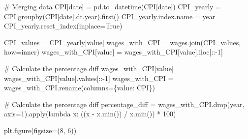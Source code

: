 \documentclass[
  letterpaper,
  DIV=11,
  numbers=noendperiod]{scrartcl}
\newenvironment{Shaded}{\begin{snugshade}}{\end{snugshade}}
\newcommand{\BuiltInTok}[1]{\textcolor[rgb]{0.00,0.23,0.31}{#1}}
\newcommand{\CommentTok}[1]{\textcolor[rgb]{0.37,0.37,0.37}{#1}}
\newcommand{\DecValTok}[1]{\textcolor[rgb]{0.68,0.00,0.00}{#1}}
\newcommand{\KeywordTok}[1]{\textcolor[rgb]{0.00,0.23,0.31}{#1}}
\newcommand{\NormalTok}[1]{\textcolor[rgb]{0.00,0.23,0.31}{#1}}
\newcommand{\OperatorTok}[1]{\textcolor[rgb]{0.37,0.37,0.37}{#1}}
\newcommand{\StringTok}[1]{\textcolor[rgb]{0.13,0.47,0.30}{#1}}
\newcommand{\VariableTok}[1]{\textcolor[rgb]{0.07,0.07,0.07}{#1}}
\begin{document}
\begin{Shaded}
\begin{Highlighting}[]
\CommentTok{\# Merging data}
\NormalTok{CPI[}\StringTok{\textquotesingle{}date\textquotesingle{}}\NormalTok{] }\OperatorTok{=}\NormalTok{ pd.to\_datetime(CPI[}\StringTok{\textquotesingle{}date\textquotesingle{}}\NormalTok{])}
\NormalTok{CPI\_yearly }\OperatorTok{=}\NormalTok{ CPI.groupby(CPI[}\StringTok{\textquotesingle{}date\textquotesingle{}}\NormalTok{].dt.year).first()}
\NormalTok{CPI\_yearly.index.name }\OperatorTok{=} \StringTok{\textquotesingle{}year\textquotesingle{}}
\NormalTok{CPI\_yearly.reset\_index(inplace}\OperatorTok{=}\VariableTok{True}\NormalTok{)}

\NormalTok{CPI\_values }\OperatorTok{=}\NormalTok{ CPI\_yearly[}\StringTok{\textquotesingle{}value\textquotesingle{}}\NormalTok{]}
\NormalTok{wages\_with\_CPI }\OperatorTok{=}\NormalTok{ wages.join(CPI\_values, how}\OperatorTok{=}\StringTok{\textquotesingle{}inner\textquotesingle{}}\NormalTok{)}
\NormalTok{wages\_with\_CPI[}\StringTok{\textquotesingle{}value\textquotesingle{}}\NormalTok{] }\OperatorTok{=}\NormalTok{ wages\_with\_CPI[}\StringTok{\textquotesingle{}value\textquotesingle{}}\NormalTok{].iloc[::}\OperatorTok{{-}}\DecValTok{1}\NormalTok{]}

\CommentTok{\# Calculate the percentage diff}
\NormalTok{wages\_with\_CPI[}\StringTok{\textquotesingle{}value\textquotesingle{}}\NormalTok{] }\OperatorTok{=}\NormalTok{ wages\_with\_CPI[}\StringTok{\textquotesingle{}value\textquotesingle{}}\NormalTok{].values[::}\OperatorTok{{-}}\DecValTok{1}\NormalTok{]}
\NormalTok{wages\_with\_CPI }\OperatorTok{=}\NormalTok{ wages\_with\_CPI.rename(columns}\OperatorTok{=}\NormalTok{\{}\StringTok{\textquotesingle{}value\textquotesingle{}}\NormalTok{: }\StringTok{\textquotesingle{}CPI\textquotesingle{}}\NormalTok{\})}

\CommentTok{\# Calculate the percentage diff}
\NormalTok{percentage\_diff }\OperatorTok{=}\NormalTok{ wages\_with\_CPI.drop(}\StringTok{\textquotesingle{}year\textquotesingle{}}\NormalTok{, axis}\OperatorTok{=}\DecValTok{1}\NormalTok{).}\BuiltInTok{apply}\NormalTok{(}\KeywordTok{lambda}\NormalTok{ x: ((x }\OperatorTok{{-}}\NormalTok{ x.}\BuiltInTok{min}\NormalTok{()) }\OperatorTok{/}\NormalTok{ x.}\BuiltInTok{min}\NormalTok{()) }\OperatorTok{*} \DecValTok{100}\NormalTok{)}

\NormalTok{plt.figure(figsize}\OperatorTok{=}\NormalTok{(}\DecValTok{8}\NormalTok{, }\DecValTok{6}\NormalTok{))}


\end{Highlighting}
\end{Shaded}
\end{document}
